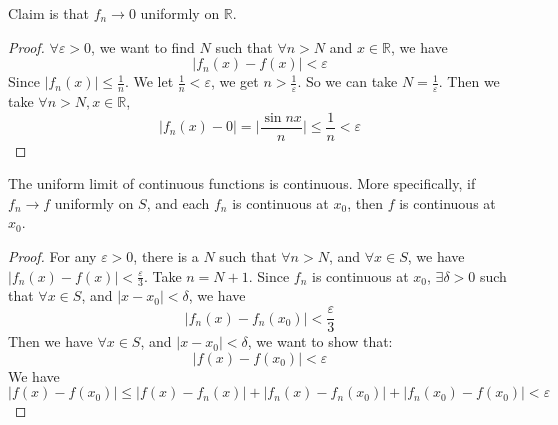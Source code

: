 \documentclass{report}
\begin{document}
\begin{examples}
\begin{example}
        Claim is that $f_{n} \rightarrow0$ uniformly on $\mathbb{R}$.
            \begin{proof}
                $\forall \varepsilon >0$, we want to find $N$ such that $\forall  n > N$ and $x \in \mathbb{R}$, we have
                    \begin{equation*}
                        \lvert  f_{n}(x) - f(x) \rvert <\varepsilon
                    \end{equation*}
                Since $\lvert f_{n}(x) \rvert \leq \frac{1}{n}$. We let $\frac{1}{n} <\varepsilon$, we get $n >\frac{1}{\varepsilon}$. So we can take $N = \frac{1}{\varepsilon}$. Then we take $\forall  n > N, x \in \mathbb{R}$, 
                    \begin{equation*}
                        \lvert f_{n}(x) - 0 \rvert = \lvert \dfrac{\sin{nx}}{n} \rvert \leq\dfrac{1}{n} <\varepsilon
                    \end{equation*}
            \end{proof}
    \end{example}
\end{examples}

\begin{theorem}{24.3}
    The uniform limit of continuous functions is continuous. More specifically, if $f_{n} \rightarrow f$ uniformly on $S$, and each $f_{n}$ is continuous at $x_{0}$, then $f$ is continuous at $x_{0}$.
\end{theorem}
    \begin{proof}
        For any $\varepsilon>0$, there is a $N$ such that $\forall  n > N$, and $\forall  x \in S$, we have $\lvert f_{n}(x) - f(x) \rvert <\frac{\varepsilon}{3}$. Take $n = N + 1$. Since $f_{n}$ is continuous at $x_{0}$, $\exists\delta>0$ such that $\forall x \in S$, and $\lvert x - x_{0} \rvert <\delta$, we have 
            \begin{equation*}
                \lvert f_{n}(x) - f_{n}(x_{0}) \rvert <\dfrac{\varepsilon}{3}
            \end{equation*}
        Then we have $\forall x \in S$, and $\lvert x - x_{0} \rvert <\delta$, we want to show that:
            \begin{equation*}
                \lvert f(x) - f(x_{0}) \rvert<\varepsilon
            \end{equation*}
        We have
            \begin{equation*}
                \lvert f(x) - f(x_{0}) \rvert \leq \lvert f(x) - f_{n}(x) \rvert + \lvert f_{n}(x) - f_{n}(x_{0}) \rvert + \lvert f_{n}(x_{0}) - f(x_{0}) \rvert <\varepsilon
            \end{equation*}
    \end{proof}
\end{document}
